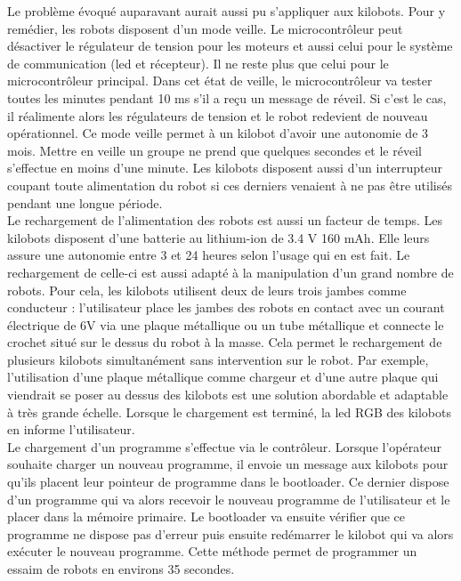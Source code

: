 \documentclass[a4paper,8pt]{report}
\begin{document}
\medskip
Le probl\`eme \'evoqu\'e auparavant aurait aussi pu s'appliquer aux kilobots. Pour y rem\'edier, les robots disposent d'un mode veille. Le microcontr\^oleur peut d\'esactiver le r\'egulateur de tension pour les moteurs et aussi celui pour le syst\`eme de communication (led et r\'ecepteur). Il ne reste plus que celui pour le microcontr\^oleur principal. Dans cet \'etat de veille, le microcontr\^oleur va tester toutes les minutes pendant 10 ms s'il a re\c cu un message de r\'eveil. Si c'est le cas, il r\'ealimente alors les r\'egulateurs de tension et le robot redevient de nouveau op\'erationnel. Ce mode veille permet \`a un kilobot d'avoir une autonomie de 3 mois. Mettre en veille un groupe ne prend que quelques secondes et le r\'eveil s'effectue en moins d'une minute. Les kilobots disposent aussi d'un interrupteur coupant toute alimentation du robot si ces derniers venaient \`a ne pas \^etre utilis\'es pendant une longue p\'eriode.\\

\medskip
Le rechargement de l'alimentation des robots est aussi un facteur de temps. Les kilobots disposent d'une batterie au lithium-ion de 3.4 V 160 mAh. Elle leurs assure une autonomie entre 3 et 24 heures selon l'usage qui en est fait. Le rechargement de celle-ci est aussi adapt\'e \`a la manipulation d'un grand nombre de robots. Pour cela, les kilobots utilisent deux de leurs trois jambes comme conducteur : l'utilisateur place les jambes des robots en contact avec un courant \'electrique de 6V via une plaque m\'etallique ou un tube m\'etallique et connecte le crochet situ\'e sur le dessus du robot \`a la masse. Cela permet le rechargement de plusieurs kilobots simultan\'ement sans intervention sur le robot. Par exemple, l'utilisation d'une plaque m\'etallique comme chargeur et d'une autre plaque qui viendrait se poser au dessus des kilobots est une solution abordable et adaptable \`a tr\`es grande \'echelle. Lorsque le chargement est termin\'e, la led RGB des kilobots en informe l'utilisateur.\\

\medskip
Le chargement d'un programme s'effectue via le contr\^oleur. Lorsque l'op\'erateur souhaite charger un nouveau programme, il envoie un message aux kilobots pour qu'ils placent leur pointeur de programme dans le bootloader. Ce dernier dispose d'un programme qui va alors recevoir le nouveau programme de l'utilisateur et le placer dans la m\'emoire primaire. Le bootloader va ensuite v\'erifier que ce programme ne dispose pas d'erreur puis ensuite red\'emarrer le kilobot qui va alors ex\'ecuter le nouveau programme. Cette m\'ethode permet de programmer un essaim de robots en environs 35 secondes. \\
\end{document}
